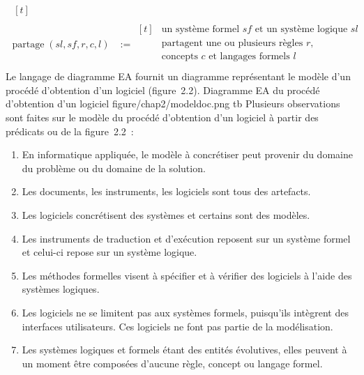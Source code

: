 {\begin{align*}
\begin{aligned}[t]
\end{aligned}\\
\operatorname{partage}(sl,sf,r,c,l) &:= 
\begin{aligned}[t]
&\text{un système formel } sf \text{ et } \text{un système logique } sl\\
&\text{partagent une ou plusieurs règles } r \text{,}\\
&\text{concepts } c \text{ et langages formels } l\\
\end{aligned}
\end{align*}
Le langage de diagramme EA fournit un diagramme représentant le modèle d'un procédé d'obtention d'un logiciel (figure~2.2).
\fig
{Diagramme EA du procédé d'obtention d'un logiciel}
{figure/chap2/modeldoc.png}
{}{}{}{tb}
Plusieurs observations sont faites sur le modèle du procédé d'obtention d'un logiciel à partir des prédicats ou de la figure~2.2~:
\begin{enumerate}[label=\alph*)]
    \item En informatique appliquée, le modèle à concrétiser peut provenir du domaine du problème ou du domaine de la solution.
    \item Les documents, les instruments, les logiciels sont tous des artefacts.
    \item Les logiciels concrétisent des systèmes et certains sont des modèles.
    \item Les instruments de traduction et d'exécution reposent sur un système formel et celui-ci repose sur un système logique.
    \item Les méthodes formelles visent à spécifier et à vérifier des logiciels à l’aide des systèmes logiques.
    \item Les logiciels ne se limitent pas aux systèmes formels, puisqu'ils intègrent des interfaces utilisateurs. Ces logiciels ne font pas partie de la modélisation. 
    \item Les systèmes logiques et formels étant des entités évolutives, elles peuvent à un moment être composées d'aucune règle, concept ou langage formel.
\end{enumerate}
\leavevmode\vspace{-\baselineskip}
}{}{}

